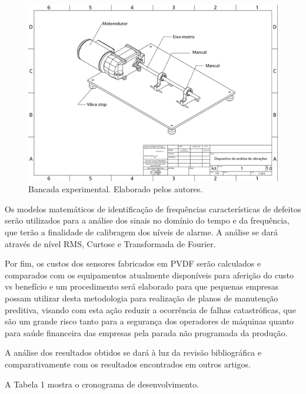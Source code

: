 \documentclass[
	12pt,				
	oneside,			
	a4paper,			
	english,			
	brazil				
	]{abntex2ppgsi}
\begin{document}
\begin{figure}[!htb]
\centering
\includegraphics{Figura22}
\caption {Bancada experimental. Elaborado pelos autores.}
\label{Figura22}
\end{figure} 

Os modelos matemáticos de identificação de frequências características de defeitos serão utilizados para a análise dos sinais no domínio do tempo e da frequência, que terão a finalidade de calibragem dos níveis de alarme. A análise se dará através de nível RMS, Curtose e Transformada de Fourier.  

Por fim, os custos dos sensores fabricados em PVDF serão calculados e comparados com os equipamentos atualmente disponíveis para aferição do custo vs benefício e um procedimento será elaborado para que pequenas empresas possam utilizar desta metodologia para realização de planos de manutenção preditiva, visando com esta ação reduzir a ocorrência de falhas catastróficas, que são um grande risco tanto para a segurança dos operadores de máquinas quanto para saúde financeira das empresas pela parada não programada da produção.

A análise dos resultados obtidos se dará à luz da revisão bibliográfica e comparativamente com os resultados encontrados em outros artigos. 

A Tabela 1 mostra o cronograma de desenvolvimento.
\end{document}
